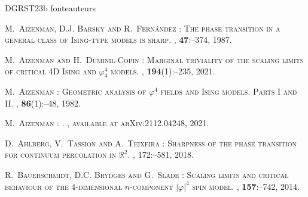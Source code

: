\documentclass[11pt,a4paper]{article}
\theoremstyle{definition}
\numberwithin{equation}{section}
\begin{document}
\begin{thebibliography}{DGRST23b}
\expandafter\ifx\csname fonteauteurs\endcsname\relax
\def\fonteauteurs{\scshape}\fi

M.~\bgroup\fonteauteurs\bgroup Aizenman\egroup\egroup{}, D.J. \bgroup\fonteauteurs\bgroup Barsky\egroup\egroup{} and R.~\bgroup\fonteauteurs\bgroup Fern{\'a}ndez\egroup\egroup{} :
\newblock The phase transition in a general class of {I}sing-type models is sharp.
, \textbf{47}\string:--374, 1987.

M.~\bgroup\fonteauteurs\bgroup Aizenman\egroup\egroup{} and H.~\bgroup\fonteauteurs\bgroup Duminil-Copin\egroup\egroup{} :
\newblock Marginal triviality of the scaling limits of critical 4{D} {I}sing and $\varphi^4_4$ models.
, \textbf{194}(1)\string:--235, 2021.

M.~\bgroup\fonteauteurs\bgroup Aizenman\egroup\egroup{} :
\newblock Geometric analysis of $\varphi^4$ fields and {I}sing models. {P}arts {I} and {II}.
, \textbf{86}(1)\string:--48, 1982.

M.~\bgroup\fonteauteurs\bgroup Aizenman\egroup\egroup{} :
.
, available at arXiv:2112.04248, 2021.

D.~\bgroup\fonteauteurs\bgroup Ahlberg\egroup\egroup{}, V.~\bgroup\fonteauteurs\bgroup Tassion\egroup\egroup{} and A.~\bgroup\fonteauteurs\bgroup Teixeira\egroup\egroup{} :
\newblock Sharpness of the phase transition for continuum percolation in $\mathbb{R}^2$.
, 172\string:--581, 2018.

R.~\bgroup\fonteauteurs\bgroup Bauerschmidt\egroup\egroup{}, D.C. \bgroup\fonteauteurs\bgroup Brydges\egroup\egroup{} and G.~\bgroup\fonteauteurs\bgroup Slade\egroup\egroup{} :
\newblock Scaling limits and critical behaviour of the $4$-dimensional $n$-component $|\varphi|^4$ spin model.
, \textbf{157}\string:--742, 2014.


\end{thebibliography}
\end{document}
